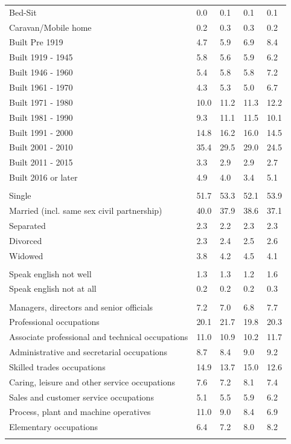 \documentclass{article}
\begin{document}
\begin{table}[h]
\begin{tabular}{KTTTT}
Bed-Sit & 0.0& 0.1& 0.1& 0.1\\
Caravan/Mobile home & 0.2& 0.3& 0.3& 0.2\\
    \hline
Built Pre 1919 & 4.7& 5.9& 6.9& 8.4\\
Built 1919 - 1945 & 5.8& 5.6& 5.9& 6.2\\
Built  1946 - 1960 & 5.4& 5.8& 5.8& 7.2\\
Built  1961 - 1970 & 4.3& 5.3& 5.0& 6.7\\
Built  1971 - 1980 & 10.0& 11.2& 11.3& 12.2\\
Built  1981 - 1990 &  9.3& 11.1& 11.5& 10.1\\
Built  1991 - 2000 & 14.8& 16.2& 16.0& 14.5\\
Built  2001 - 2010 & 35.4& 29.5& 29.0& 24.5\\
Built  2011 - 2015 & 3.3& 2.9& 2.9& 2.7\\
Built  2016 or later & 4.9& 4.0& 3.4& 5.1\\
\hline
    \\
    \hline
Single & 51.7& 53.3& 52.1& 53.9\\
Married (incl. same sex civil partnership) & 40.0& 37.9& 38.6& 37.1\\
Separated  & 2.3& 2.2& 2.3& 2.3\\
Divorced  & 2.3& 2.4& 2.5& 2.6\\
Widowed & 3.8& 4.2& 4.5& 4.1\\
\hline
    \\ 
    \hline
Speak english not well & 1.3& 1.3& 1.2& 1.6\\
Speak english not at all & 0.2& 0.2& 0.2& 0.3\\
\hline
    \\
    \hline
Managers, directors and senior officials & 7.2& 7.0& 6.8& 7.7\\
Professional occupations & 20.1& 21.7& 19.8& 20.3\\
Associate professional and technical occupations & 11.0& 10.9& 10.2& 11.7\\
Administrative and secretarial occupations & 8.7& 8.4& 9.0& 9.2\\
Skilled trades occupations & 14.9& 13.7& 15.0& 12.6\\
Caring, leisure and other service occupations & 7.6& 7.2& 8.1& 7.4\\
Sales and customer service occupations & 5.1& 5.5& 5.9& 6.2\\
Process, plant and machine operatives & 11.0&  9.0&  8.4&  6.9\\
Elementary occupations & 6.4& 7.2& 8.0& 8.2\\
\hline
\end{tabular}
\end{table}
\end{document}

